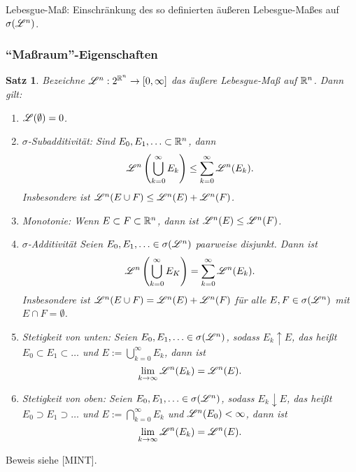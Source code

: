 \documentclass[
 a4paper,
 12pt,
 parskip=half
 ]{scrartcl}
\theoremstyle{plain}
\newtheorem*{thm*}{Satz}
\theoremstyle{definition}
\numberwithin{equation}{section}
\begin{document}
 Lebesgue-Maß: Einschränkung des so definierten äußeren Lebesgue-Maßes auf $\sigma( \mathscr{L}^n )$.
 
\subsubsection{``Maßraum''-Eigenschaften}
\begin{thm*}
 Bezeichne $\mathscr{L}^n: 2^{\mathbb{R}^n} \to [0, \infty]$ das äußere Lebesgue-Maß auf $\mathbb{R}^n$. Dann gilt:
 \begin{enumerate}
  \item $\mathscr{L}( \emptyset ) = 0$.
  \item $\sigma$-Subadditivität: Sind $E_0, E_1, \ldots \subset \mathbb{R}^n$, dann
   \[ \mathscr{L}^n \left( \bigcup_{k=0}^\infty E_k \right) \le \sum_{k=0}^\infty \mathscr{L}^n (E_k). \]
   Insbesondere ist $\mathscr{L}^n (E \cup F) \le \mathscr{L}^n (E) + \mathscr{L}^n (F)$.
  \item Monotonie: Wenn $E \subset F \subset \mathbb{R}^n$, dann ist $\mathscr{L}^n (E) \le \mathscr{L}^n (F)$.
  \item $\sigma$-Additivität Seien $E_0, E_1, \ldots \in \sigma(\mathscr{L}^n)$ paarweise disjunkt. Dann ist
   \[ \mathscr{L}^n \left( \bigcup_{k=0}^\infty E_K \right) = \sum_{k=0}^\infty \mathscr{L}^n (E_k). \]
   Insbesondere ist $\mathscr{L}^n (E \cup F) = \mathscr{L}^n (E) + \mathscr{L}^n (F)$ für alle $E,F \in \sigma(\mathscr{L}^n)$ mit $E \cap F = \emptyset$.
  \item Stetigkeit von unten: Seien $E_0, E_1, \ldots \in \sigma(\mathscr{L}^n)$, sodass $E_k \uparrow E$, das heißt $E_0 \subset E_1 \subset \ldots$ und $E := \bigcup_{k=0}^\infty E_k$, dann ist
   \[ \lim_{k \to \infty} \mathscr{L}^n(E_k) =  \mathscr{L}^n (E). \]
  \item Stetigkeit von oben: Seien $E_0, E_1, \ldots \in \sigma(\mathscr{L}^n)$, sodass $E_k \downarrow E$, das heißt $E_0 \supset E_1 \supset \ldots$ und $E := \bigcap_{k=0}^\infty E_k$ und $\mathscr{L}^n(E_0) < \infty$, dann ist
   \[ \lim_{k \to \infty} \mathscr{L}^n(E_k) =  \mathscr{L}^n (E). \]
 \end{enumerate}
\end{thm*}

Beweis siehe [MINT].
\end{document}
